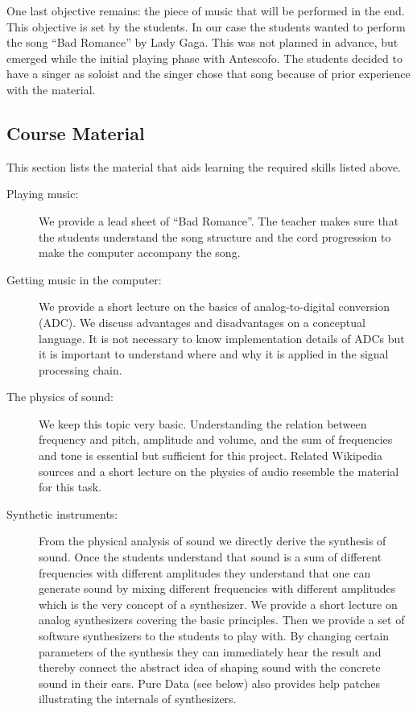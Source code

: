 \documentclass[onecolumn,nocopyrightspace,preprint]{sigplanconf}
\begin{document}
One last objective remains: the piece of music that will be performed in the
end. This objective is set by the students. In our case the students wanted to
perform the song ``Bad Romance'' by Lady Gaga. This was not planned in
advance, but emerged while the initial playing phase with Antescofo. The
students decided to have a singer as soloist and the singer chose that song
because of prior experience with the material.


\subsection{Course Material}\label{sec:material}


This section lists the material that aids learning the required skills listed above.

\begin{description}

\item[Playing music:] We provide a lead sheet of ``Bad Romance''. The teacher
makes sure that the students understand the song structure and the cord progression
to make the computer accompany the song. 

\item[Getting music in the computer:] We provide a short lecture on the basics
of analog-to-digital conversion (ADC). We discuss advantages and disadvantages
on a conceptual language. It is not necessary to know implementation details
of ADCs but it is important to understand where and why it is applied in the
signal processing chain.

\item[The physics of sound:] We keep this topic very basic. Understanding the
relation between frequency and pitch, amplitude and volume, and the sum of
frequencies and tone is essential but sufficient for this project. Related
Wikipedia sources and a short lecture on the physics of audio resemble the
material for this task.

\item[Synthetic instruments:] From the physical analysis of sound we directly
derive the synthesis of sound. Once the students understand that sound is a
sum of different frequencies  with different amplitudes they understand that
one can generate sound by mixing different frequencies with different
amplitudes which is the very concept of a synthesizer. We provide a short
lecture on analog synthesizers covering the basic principles. Then we
provide a set of software synthesizers to the students to play with. By
changing certain parameters of the synthesis they can immediately hear the
result and thereby connect the abstract idea of shaping sound with the
concrete sound in their ears. Pure Data (see below) also provides help patches
illustrating the internals of synthesizers.


\end{description}
\end{document}
